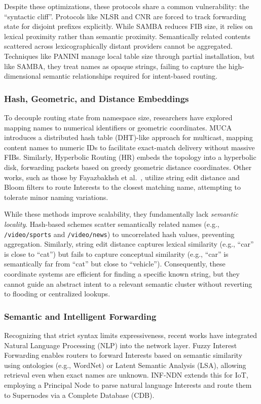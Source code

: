 \documentclass[conference]{IEEEtran}
\begin{document}
Despite these optimizations, these protocols share a common vulnerability: the ``syntactic cliff''. Protocols like NLSR and CNR are forced to track forwarding state for disjoint prefixes explicitly. While SAMBA reduces FIB size, it relies on lexical proximity rather than semantic proximity. Semantically related contents scattered across lexicographically distant providers cannot be aggregated. Techniques like PANINI\cite{panini} manage local table size through partial installation, but like SAMBA, they treat names as opaque strings, failing to capture the high-dimensional semantic relationships required for intent-based routing.

\subsubsection{Hash, Geometric, and Distance Embeddings}
To decouple routing state from namespace size, researchers have explored mapping names to numerical identifiers or geometric coordinates.
MUCA\cite{muca} introduces a distributed hash table (DHT)-like approach for multicast, mapping content names to numeric IDs to facilitate exact-match delivery without massive FIBs. Similarly, Hyperbolic Routing (HR)\cite{hyperbolic} embeds the topology into a hyperbolic disk, forwarding packets based on greedy geometric distance coordinates.
Other works, such as those by Fayazbakhsh et al.~\cite{distance_info}, utilize string edit distance and Bloom filters to route Interests to the closest matching name, attempting to tolerate minor naming variations.

While these methods improve scalability, they fundamentally lack \textit{semantic locality}. Hash-based schemes scatter semantically related names (e.g., \texttt{/video/sports} and \texttt{/video/news}) to uncorrelated hash values, preventing aggregation. Similarly, string edit distance captures lexical similarity (e.g., ``car'' is close to ``cat'') but fails to capture conceptual similarity (e.g., ``car'' is semantically far from ``cat'' but close to ``vehicle''). Consequently, these coordinate systems are efficient for finding a specific known string, but they cannot guide an abstract intent to a relevant semantic cluster without reverting to flooding or centralized lookups.

\subsubsection{Semantic and Intelligent Forwarding}
Recognizing that strict syntax limits expressiveness, recent works have integrated Natural Language Processing (NLP) into the network layer.
Fuzzy Interest Forwarding\cite{fuzzy_forwarding} enables routers to forward Interests based on semantic similarity using ontologies (e.g., WordNet) or Latent Semantic Analysis (LSA), allowing retrieval even when exact names are unknown.
INF-NDN\cite{inf_ndn_iot} extends this for IoT, employing a Principal Node to parse natural language Interests and route them to Supernodes via a Complete Database (CDB).
\end{document}
